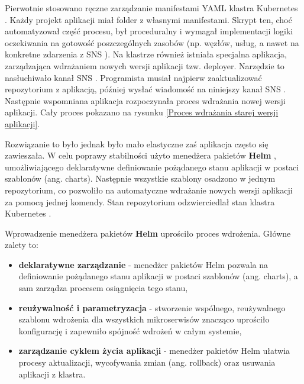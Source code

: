 Pierwotnie stosowano ręczne zarządzanie manifestami YAML \cite{yaml_spec} klastra Kubernetes \cite{kubernetes}. Każdy projekt aplikacji miał folder z własnymi manifestami. Skrypt ten, choć automatyzował część procesu, był proceduralny i wymagał implementacji logiki oczekiwania na gotowość poszczególnych zasobów (np. węzłów, usług, a nawet na konkretne zdarzenia z SNS \cite{sns_docs}). Na klastrze również istniała specjalna aplikacja, zarządzająca wdrażaniem nowych wersji aplikacji tzw. deployer. Narzędzie to nasłuchiwało kanał SNS \cite{sns_docs}. Programista musiał najpierw zaaktualizować repozytorium z aplikacją, później wysłać wiadomość na niniejszy kanał SNS \cite{sns_docs}. Następnie wspomniana aplikacja rozpoczynała proces wdrażania nowej wersji aplikacji. Cały proces pokazano na rysunku \ref{Proces wdrażania starej wersji aplikacji}.


Rozwiązanie to było jednak było mało elastyczne zaś aplikacja często się zawieszała. W celu poprawy stabilności użyto menedżera pakietów \textbf{Helm} \cite{helm_docs}, umożliwiającego deklaratywne definiowanie pożądanego stanu aplikacji w postaci szablonów (ang. charts). Następnie wszystkie szablony osadzono w jednym repozytorium, co pozwoliło na automatyczne wdrażanie nowych wersji aplikacji za pomocą jednej komendy. Stan repozytorium odzwierciedlał stan klastra Kubernetes \cite{kubernetes}.

\newpage

Wprowadzenie menedżera pakietów \textbf{Helm} \cite{helm_docs} uprościło proces wdrożenia. Główne zalety to:
\begin{itemize}
    \item \textbf{deklaratywne zarządzanie} - menedżer pakietów Helm \cite{helm_docs} pozwala na definiowanie pożądanego stanu aplikacji w postaci szablonów (ang. charts), a sam zarządza procesem osiągnięcia tego stanu,
    \item \textbf{reużywalność i parametryzacja} - stworzenie wspólnego, reużywalnego szablonu wdrożenia dla wszystkich mikroserwisów znacząco uprościło konfigurację i zapewniło spójność wdrożeń w całym systemie,
    \item \textbf{zarządzanie cyklem życia aplikacji} - menedżer pakietów Helm \cite{helm_docs} ułatwia procesy aktualizacji, wycofywania zmian (ang. rollback) oraz usuwania aplikacji z klastra.
\end{itemize}

